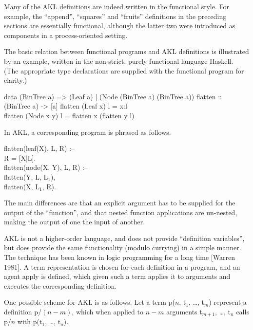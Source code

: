 Many of the AKL definitions are indeed written in the functional
style.  For example, the ``{\prog append}'', ``{\prog squares}'' and
``{\prog fruits}'' definitions in the preceding sections are
essentially functional, although the latter two were introduced as
components in a process-oriented setting.

The basic relation between functional programs and AKL definitions is
illustrated by an example, written in the non-strict, purely
functional language Haskell.  (The appropriate type declarations are
supplied with the functional program for clarity.)
%
\begin{program}
data (BinTree a) => (Leaf a) | (Node (BinTree a) (BinTree a)) \nl
flatten :: (BinTree a) -> [a] \nl
flatten (Leaf x) l = x:l \\
flatten (Node x y) l = flatten x (flatten y l)
\end{program}%
%
In AKL, a corresponding program is phrased as follows.
%
\begin{program}
flatten(leaf(X), L, R) :-- \\
\>\cond\>	R = [X|L].  \\
flatten(node(X, Y), L, R) :-- \\
\>\cond\>	flatten(Y, L, L$_1$), \\
\>\>	flatten(X, L$_1$, R).
\end{program}%
%
The main differences are that an explicit argument has to be supplied
for the output of the ``function'', and that nested function
applications are un-nested, making the output of one the input of
another.

AKL is not a higher-order language, and does not provide ``definition
variables'', but does provide the same functionality (modulo currying)
in a simple manner.  The technique has been known in logic programming
for a long time [Warren 1981].  A term representation is chosen for
each definition in a program, and an agent apply is defined, which
given such a term applies it to arguments and executes the
corresponding definition.

One possible scheme for AKL is as follows.  Let a term {\prog p($n$,
t$_1$, \dots, t$_m$)} represent a definition {\prog p/$(n-m)$}, which
when applied to $n-m$ arguments {\prog t$_{m+1}$, \dots, t$_n$} calls
{\prog p/$n$} with {\prog p(t$_1$,
\dots, t$_n$)}.

